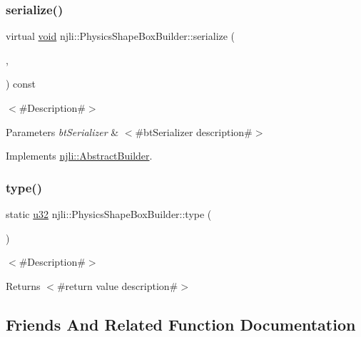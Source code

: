 \subsubsection{\texorpdfstring{serialize()}{serialize()}}
{\footnotesize\ttfamily virtual \mbox{\hyperlink{_thread_8h_af1e856da2e658414cb2456cb6f7ebc66}{void}} njli\+::\+Physics\+Shape\+Box\+Builder\+::serialize (\begin{DoxyParamCaption}\item[{\mbox{\hyperlink{_thread_8h_af1e856da2e658414cb2456cb6f7ebc66}{void}} $\ast$}]{,  }\item[{bt\+Serializer $\ast$}]{ }\end{DoxyParamCaption}) const\hspace{0.3cm}{\ttfamily [virtual]}}

$<$\#\+Description\#$>$


\begin{DoxyParams}{Parameters}
{\em bt\+Serializer} & $<$\#bt\+Serializer description\#$>$ \\
\hline
\end{DoxyParams}


Implements \mbox{\hyperlink{classnjli_1_1_abstract_builder_ab66b774e02ccb9da554c9aab7fa6d981}{njli\+::\+Abstract\+Builder}}.

\mbox{\label{classnjli_1_1_physics_shape_box_builder_afeb5a27c03c011899dc92d3925d14411}} 
\subsubsection{\texorpdfstring{type()}{type()}}
{\footnotesize\ttfamily static \mbox{\hyperlink{_util_8h_a10e94b422ef0c20dcdec20d31a1f5049}{u32}} njli\+::\+Physics\+Shape\+Box\+Builder\+::type (\begin{DoxyParamCaption}{ }\end{DoxyParamCaption})\hspace{0.3cm}{\ttfamily [static]}}

$<$\#\+Description\#$>$

\begin{DoxyReturn}{Returns}
$<$\#return value description\#$>$ 
\end{DoxyReturn}


\subsection{Friends And Related Function Documentation}
\mbox{\label{classnjli_1_1_physics_shape_box_builder_acb96ebb09abe8f2a37a915a842babfac}} 
